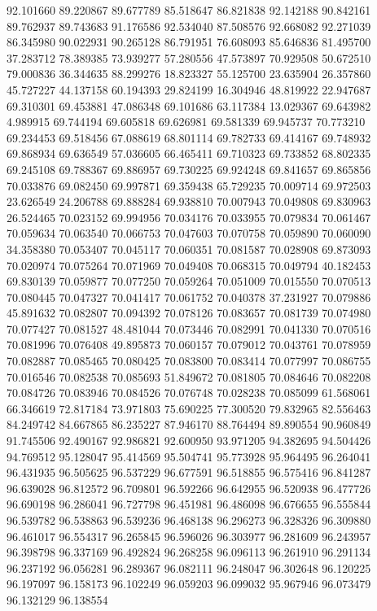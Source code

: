 92.101660
89.220867
89.677789
85.518647
86.821838
92.142188
90.842161
89.762937
89.743683
91.176586
92.534040
87.508576
92.668082
92.271039
86.345980
90.022931
90.265128
86.791951
76.608093
85.646836
81.495700
37.283712
78.389385
73.939277
57.280556
47.573897
70.929508
50.672510
79.000836
36.344635
88.299276
18.823327
55.125700
23.635904
26.357860
45.727227
44.137158
60.194393
29.824199
16.304946
48.819922
22.947687
69.310301
69.453881
47.086348
69.101686
63.117384
13.029367
69.643982
4.989915
69.744194
69.605818
69.626981
69.581339
69.945737
70.773210
69.234453
69.518456
67.088619
68.801114
69.782733
69.414167
69.748932
69.868934
69.636549
57.036605
66.465411
69.710323
69.733852
68.802335
69.245108
69.788367
69.886957
69.730225
69.924248
69.841657
69.865856
70.033876
69.082450
69.997871
69.359438
65.729235
70.009714
69.972503
23.626549
24.206788
69.888284
69.938810
70.007943
70.049808
69.830963
26.524465
70.023152
69.994956
70.034176
70.033955
70.079834
70.061467
70.059634
70.063540
70.066753
70.047603
70.070758
70.059890
70.060090
34.358380
70.053407
70.045117
70.060351
70.081587
70.028908
69.873093
70.020974
70.075264
70.071969
70.049408
70.068315
70.049794
40.182453
69.830139
70.059877
70.077250
70.059264
70.051009
70.015550
70.070513
70.080445
70.047327
70.041417
70.061752
70.040378
37.231927
70.079886
45.891632
70.082807
70.094392
70.078126
70.083657
70.081739
70.074980
70.077427
70.081527
48.481044
70.073446
70.082991
70.041330
70.070516
70.081996
70.076408
49.895873
70.060157
70.079012
70.043761
70.078959
70.082887
70.085465
70.080425
70.083800
70.083414
70.077997
70.086755
70.016546
70.082538
70.085693
51.849672
70.081805
70.084646
70.082208
70.084726
70.083946
70.084526
70.076748
70.028238
70.085099
61.568061
66.346619
72.817184
73.971803
75.690225
77.300520
79.832965
82.556463
84.249742
84.667865
86.235227
87.946170
88.764494
89.890554
90.960849
91.745506
92.490167
92.986821
92.600950
93.971205
94.382695
94.504426
94.769512
95.128047
95.414569
95.504741
95.773928
95.964495
96.264041
96.431935
96.505625
96.537229
96.677591
96.518855
96.575416
96.841287
96.639028
96.812572
96.709801
96.592266
96.642955
96.520938
96.477726
96.690198
96.286041
96.727798
96.451981
96.486098
96.676655
96.555844
96.539782
96.538863
96.539236
96.468138
96.296273
96.328326
96.309880
96.461017
96.554317
96.265845
96.596026
96.303977
96.281609
96.243957
96.398798
96.337169
96.492824
96.268258
96.096113
96.261910
96.291134
96.237192
96.056281
96.289367
96.082111
96.248047
96.302648
96.120225
96.197097
96.158173
96.102249
96.059203
96.099032
95.967946
96.073479
96.132129
96.138554

